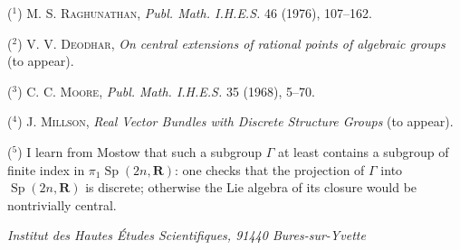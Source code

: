 \documentclass[10pt]{amsart}
\theoremstyle{plain}
\theoremstyle{definition}
\DeclareMathOperator{\Sp}{Sp}
\begin{document}
\noindent($^1$) M. S. \textsc{Raghunathan}, \textit{Publ. Math. I.H.E.S.} 46 (1976), 107--162.

\noindent($^2$) V. V. \textsc{Deodhar}, \textit{On central extensions of rational points of algebraic groups} (to appear).

\noindent($^3$) C. C. \textsc{Moore}, \textit{Publ. Math. I.H.E.S.} 35 (1968), 5--70.

\noindent($^4$) J. \textsc{Millson}, \textit{Real Vector Bundles with Discrete Structure Groups} (to appear).

\noindent($^5$) I learn from Mostow that such a subgroup $\Gamma$ at least contains a subgroup of finite index in $\pi_1\Sp(2n,\mathbf R)$: one checks that the projection of $\Gamma$ into $\Sp(2n,\mathbf R)$ is discrete; otherwise the Lie algebra of its closure would be nontrivially central.

\vspace{1cm}

\begin{flushright}
\textit{Institut des Hautes Études Scientifiques, 91440 Bures-sur-Yvette}
\end{flushright}
\end{document}
